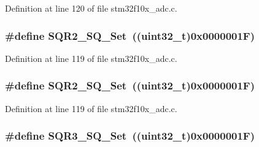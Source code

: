 Definition at line 120 of file stm32f10x\+\_\+adc.\+c.

\subsubsection[{\texorpdfstring{S\+Q\+R2\+\_\+\+S\+Q\+\_\+\+Set}{SQR2_SQ_Set}}]{\setlength{\rightskip}{0pt plus 5cm}\#define S\+Q\+R2\+\_\+\+S\+Q\+\_\+\+Set~(({\bf uint32\+\_\+t})0x0000001\+F)}\hypertarget{group___a_d_c___private___defines_ga2329f779aee00e5990d6430a01de8cb0}{}\label{group___a_d_c___private___defines_ga2329f779aee00e5990d6430a01de8cb0}


Definition at line 119 of file stm32f10x\+\_\+adc.\+c.

\subsubsection[{\texorpdfstring{S\+Q\+R2\+\_\+\+S\+Q\+\_\+\+Set}{SQR2_SQ_Set}}]{\setlength{\rightskip}{0pt plus 5cm}\#define S\+Q\+R2\+\_\+\+S\+Q\+\_\+\+Set~(({\bf uint32\+\_\+t})0x0000001\+F)}\hypertarget{group___a_d_c___private___defines_ga2329f779aee00e5990d6430a01de8cb0}{}\label{group___a_d_c___private___defines_ga2329f779aee00e5990d6430a01de8cb0}


Definition at line 119 of file stm32f10x\+\_\+adc.\+c.

\subsubsection[{\texorpdfstring{S\+Q\+R3\+\_\+\+S\+Q\+\_\+\+Set}{SQR3_SQ_Set}}]{\setlength{\rightskip}{0pt plus 5cm}\#define S\+Q\+R3\+\_\+\+S\+Q\+\_\+\+Set~(({\bf uint32\+\_\+t})0x0000001\+F)}\hypertarget{group___a_d_c___private___defines_ga8a04f115021dc5261562b4dc04c01109}{}\label{group___a_d_c___private___defines_ga8a04f115021dc5261562b4dc04c01109}


